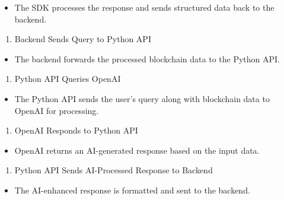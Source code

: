 \documentclass[
]{article}
\providecommand{\tightlist}{%
  \setlength{\itemsep}{0pt}\setlength{\parskip}{0pt}}
\begin{document}
\begin{itemize}
\tightlist
\item
  The SDK processes the response and sends structured data back to the
  backend.
\end{itemize}

\begin{enumerate}
\def\labelenumi{\arabic{enumi}.}
\setcounter{enumi}{8}
\tightlist
\item
  Backend Sends Query to Python API
\end{enumerate}

\begin{itemize}
\tightlist
\item
  The backend forwards the processed blockchain data to the Python API.
\end{itemize}

\begin{enumerate}
\def\labelenumi{\arabic{enumi}.}
\setcounter{enumi}{9}
\tightlist
\item
  Python API Queries OpenAI
\end{enumerate}

\begin{itemize}
\tightlist
\item
  The Python API sends the user's query along with blockchain data to
  OpenAI for processing.
\end{itemize}

\begin{enumerate}
\def\labelenumi{\arabic{enumi}.}
\setcounter{enumi}{10}
\tightlist
\item
  OpenAI Responds to Python API
\end{enumerate}

\begin{itemize}
\tightlist
\item
  OpenAI returns an AI-generated response based on the input data.
\end{itemize}

\begin{enumerate}
\def\labelenumi{\arabic{enumi}.}
\setcounter{enumi}{11}
\tightlist
\item
  Python API Sends AI-Processed Response to Backend
\end{enumerate}

\begin{itemize}
\tightlist
\item
  The AI-enhanced response is formatted and sent to the backend.
\end{itemize}
\end{document}
